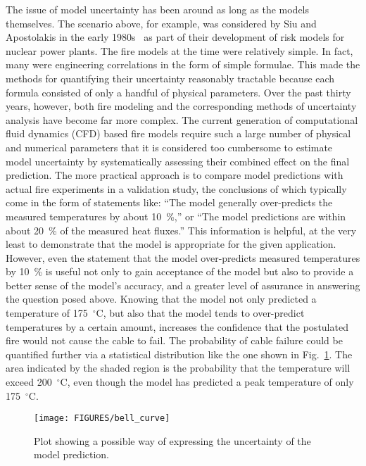 The issue of model uncertainty has been around as long as the models themselves. The scenario above, for example, was considered by Siu and Apostolakis in the early 1980s~\cite{Siu:RE1982} as part of their development of risk models for nuclear power plants. The fire models at the time were relatively simple. In fact, many were engineering correlations in the form of simple formulae. This made the methods for quantifying their uncertainty reasonably tractable because each formula consisted of only a handful of physical parameters. Over the past thirty years, however, both fire modeling and the corresponding methods of uncertainty analysis have become far more complex. The current generation of computational fluid dynamics (CFD) based fire models require such a large number of physical and numerical parameters that it is considered too cumbersome to estimate model uncertainty by systematically assessing their combined effect on the final prediction. The more practical approach is to compare model predictions with actual fire experiments in a validation study, the conclusions of which typically come in the form of statements like: ``The model generally over-predicts the measured temperatures by about 10~\%,'' or ``The model predictions are within about 20~\% of the measured heat fluxes.'' This information is helpful, at the very least to demonstrate that the model is appropriate for the given application. However, even the statement that the model over-predicts measured temperatures by 10~\% is useful not only to gain acceptance of the model but also to provide a better sense of the model's accuracy, and a greater level of assurance in answering the question posed above. Knowing that the model not only predicted a temperature of 175~$^\circ$C, but also that the model tends to over-predict temperatures by a certain amount, increases the confidence that the postulated fire would not cause the cable to fail. The probability of cable failure could be quantified further via a statistical distribution like the one shown in Fig.~\ref{bell_curve}. The area indicated by the shaded region is the probability that the temperature will exceed 200~$^\circ$C, even though the model has predicted a peak temperature of only 175~$^\circ$C.
\begin{figure}[ht]
\begin{center}
\texttt{[image: FIGURES/bell\_curve]}
\end{center}
\caption[Demonstration of model uncertainty]{Plot showing a possible way of expressing the uncertainty of the model prediction.}
\label{bell_curve}
\end{figure}


